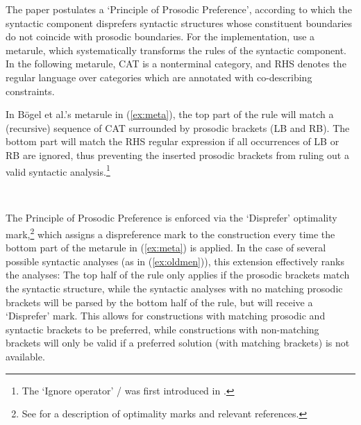 \documentclass[output=paper,hidelinks]{langscibook}
\begin{document}
\noindent The paper postulates a `Principle of Prosodic Preference', according to which the syntactic component  disprefers syntactic structures whose constituent boundaries do not coincide with prosodic boundaries. For the implementation, \citet{boegeletal09} use a metarule, which systematically transforms the rules of the syntactic component. In the following metarule, CAT is a nonterminal category, and RHS denotes the regular language over categories which are annotated with co-describing constraints.

\ea
\z

\noindent In Bögel et al.'s metarule in (\ref{ex:meta}), the top part of the rule will match a (recursive) sequence of CAT surrounded by prosodic brackets (LB and RB). The bottom part will match the RHS regular expression if all occurrences of LB or RB are ignored, thus preventing the inserted prosodic brackets from ruling out a valid syntactic analysis.\footnote{The `Ignore operator' / was first introduced in \citet{KaplanKay1994}.}


\ea\label{ex:meta}\ 

\vspace{-4.1ex}
\z

\noindent The Principle of Prosodic Preference is enforced via the `Disprefer' optimality mark,\footnote{See  for a description of optimality marks and relevant references.} %
which assigns a dispreference mark to the construction every time the bottom part of the metarule in (\ref{ex:meta}) is applied. In the case of several possible syntactic analyses (as in (\ref{ex:oldmen})), this extension effectively ranks the analyses: The top half of the rule only applies if the prosodic brackets match the syntactic structure, while the syntactic analyses with no matching prosodic brackets will be parsed by the bottom half of the rule, but will receive a `Disprefer' mark. This allows for constructions with matching prosodic and syntactic brackets to be preferred, while constructions with non-matching brackets will only be valid if a preferred solution (with matching brackets) is not available.
\end{document}
